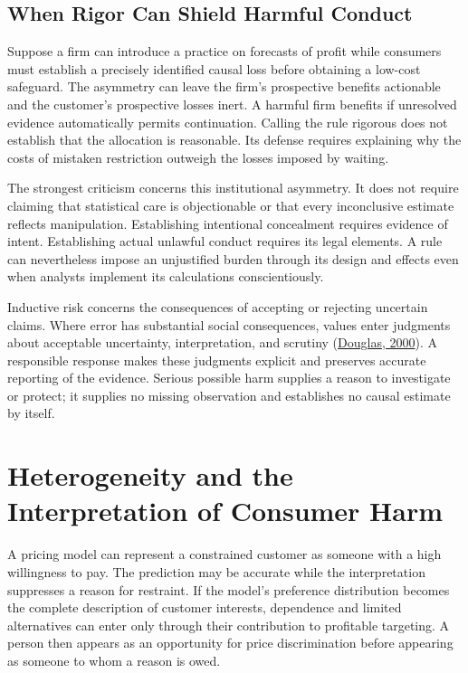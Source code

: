 \hypertarget{M09-when-rigor-can-shield-harmful-conduct}{%
\subsection{When Rigor Can Shield Harmful
Conduct}\label{M09-when-rigor-can-shield-harmful-conduct}}

\noindent Suppose a firm can introduce a practice on forecasts of profit while
consumers must establish a precisely identified causal loss before
obtaining a low-cost safeguard. The asymmetry can leave the firm's
prospective benefits actionable and the customer's prospective losses
inert. A harmful firm benefits if unresolved evidence automatically
permits continuation. Calling the rule rigorous does not establish that
the allocation is reasonable. Its defense requires explaining why the
costs of mistaken restriction outweigh the losses imposed by waiting.

The strongest criticism concerns this institutional asymmetry. It does
not require claiming that statistical care is objectionable or that
every inconclusive estimate reflects manipulation. Establishing
intentional concealment requires evidence of intent. Establishing actual
unlawful conduct requires its legal elements. A rule can nevertheless
impose an unjustified burden through its design and effects even when
analysts implement its calculations conscientiously.

Inductive risk concerns the consequences of accepting or rejecting
uncertain claims. Where error has substantial social consequences,
values enter judgments about acceptable uncertainty, interpretation, and
scrutiny
(\href{https://www.stephanieruphy.com/wp-content/uploads/2020/10/Douglas-2000.pdf}{Douglas,
2000}). A responsible response makes these judgments explicit and
preserves accurate reporting of the evidence. Serious possible harm
supplies a reason to investigate or protect; it supplies no missing
observation and establishes no causal estimate by itself.


\hypertarget{M09-heterogeneity-and-the-interpretation-of-consumer-harm}{%
\section{Heterogeneity and the Interpretation of Consumer
Harm}\label{M09-heterogeneity-and-the-interpretation-of-consumer-harm}}

\noindent A pricing model can represent a constrained customer as someone with a
high willingness to pay. The prediction may be accurate while the
interpretation suppresses a reason for restraint. If the model's
preference distribution becomes the complete description of customer
interests, dependence and limited alternatives can enter only through
their contribution to profitable targeting. A person then appears as an
opportunity for price discrimination before appearing as someone to whom
a reason is owed.

